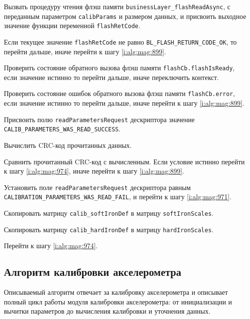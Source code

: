 \begin{enumerate_step}
    \item Вызвать процедуру чтения флэш памяти \lstinline|businessLayer_flashReadAsync|, с переданным параметром \lstinline|calibParams| и размером данных, и присвоить выходное значение функции переменной \lstinline|flashRetCode|.
    \item Если текущее значение \lstinline|flashRetCode| не равно \lstinline|BL_FLASH_RETURN_CODE_OK|, то перейти дальше, иначе перейти к шагу
    \ref{i:alg:mag:899}.
    \item Проверить состояние обратного вызова флэш памяти \lstinline|flashCb.flashIsReady|, если значение истинно то перейти дальше, иначе переключить контекст.
    \item Проверить состояние ошибок обратного вызова флэш памяти \lstinline|flashCb.error|, если значение истинно то перейти дальше, иначе перейти к шагу \ref{i:alg:mag:899}.
    \item Присвоить полю \lstinline|readParametersRequest| дескриптора значение \lstinline|CALIB_PARAMETERS_WAS_READ_SUCCESS|.
    \item Вычислить CRC-код прочитанных данных.
    \item Сравнить прочитанный CRC-код с вычисленным. Если условие истинно перейти к шагу \ref{i:alg:mag:974}, иначе перейти к шагу \ref{i:alg:mag:899}.
    \item \label{i:alg:mag:899} Установить поле \lstinline|readParametersRequest| дескриптора равным \lstinline|CALIBRATION_PARAMETERS_WAS_READ_FAIL|, и перейти к шагу \ref{i:alg:mag:971}.
    \item \label{i:alg:mag:971} \item Скопировать матрицу \lstinline|calib_softIronDef| в матрицу \lstinline|softIronScales|.
    \item Скопировать матрицу \lstinline|calib_hardIronDef| в матрицу \lstinline|hardIronScales|.
    \item Перейти к шагу \ref{i:alg:mag:974}.
\end{enumerate_step}

\subsection{Алгоритм калибровки акселерометра}

Описываемый алгоритм отвечает за калибровку акселерометра и описывает полный цикл работы модуля калибровки акселерометра: от инициализации и вычитки параметров до
вычисления калибровки и уточнения данных. 

